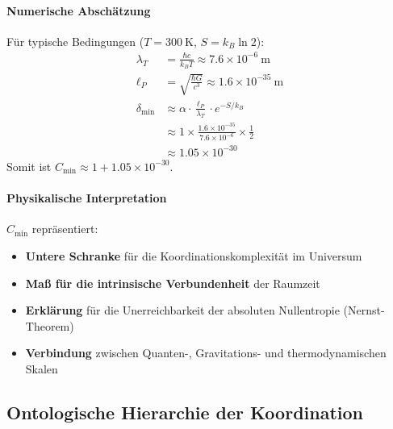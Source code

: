 \documentclass[11pt,a4paper]{article}
\begin{document}
	\paragraph{Numerische Abschätzung}
	Für typische Bedingungen ($T = 300\ \mathrm{K}$, $S = k_B \ln 2$):
	\begin{align}
		\lambda_T &= \frac{\hbar c}{k_B T} \approx 7.6 \times 10^{-6}\ \mathrm{m} \\
		\ell_P &= \sqrt{\frac{\hbar G}{c^3}} \approx 1.6 \times 10^{-35}\ \mathrm{m} \\
		\delta_{\min} &\approx \alpha \cdot \frac{\ell_P}{\lambda_T} \cdot e^{-S/k_B} \\
		&\approx 1 \times \frac{1.6 \times 10^{-35}}{7.6 \times 10^{-6}} \times \frac{1}{2} \\
		&\approx 1.05 \times 10^{-30}
	\end{align}
	Somit ist $C_{\min} \approx 1 + 1.05 \times 10^{-30}$.
	
	\paragraph{Physikalische Interpretation}
	$C_{\min}$ repräsentiert:
	\begin{itemize}
		\item \textbf{Untere Schranke} für die Koordinationskomplexität im Universum
		\item \textbf{Maß für die intrinsische Verbundenheit} der Raumzeit
		\item \textbf{Erklärung} für die Unerreichbarkeit der absoluten Nullentropie (Nernst-Theorem)
		\item \textbf{Verbindung} zwischen Quanten-, Gravitations- und thermodynamischen Skalen
	\end{itemize}
	
	\subsection{Ontologische Hierarchie der Koordination}
	
\end{document}
